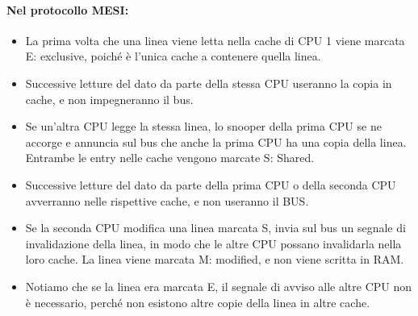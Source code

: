 
\paragraph{Nel protocollo MESI:}

\begin{itemize}
  \item La prima volta che una linea viene letta nella cache di CPU 1 viene
marcata E: exclusive, poiché è l’unica cache a contenere quella
linea. 
\item Successive letture del dato da parte della stessa CPU useranno la
copia in cache, e non impegneranno il bus. 
\item Se un'altra CPU legge la stessa linea, lo snooper della prima CPU se ne accorge e
annuncia sul bus che anche la prima CPU ha una copia della linea.
Entrambe le entry nelle cache vengono marcate S: Shared.
\item Successive letture del dato da parte della prima CPU o della seconda CPU avverranno
nelle rispettive cache, e non useranno il BUS.
\item Se la seconda CPU modifica una linea marcata S, invia sul bus un segnale di
invalidazione della linea, in modo che le altre CPU possano
invalidarla nella loro cache. La linea viene marcata M: modified, e
non viene scritta in RAM. 
\item Notiamo che se la linea era marcata E, il segnale di avviso alle altre
CPU non è necessario, perché non esistono altre copie della linea in
altre cache. 
\end{itemize}


